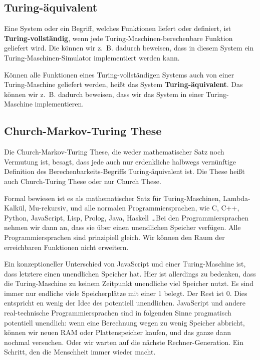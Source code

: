 \documentclass[a4paper]{amsart}
\theoremstyle{definition}
\begin{document}
\subsection{Turing-äquivalent}
Eine System oder ein Begriff, welches Funktionen liefert oder definiert, ist \textbf{Turing-vollständig}, wenn jede Turing-Maschinen-berechenbare Funktion geliefert wird. Die können wir z.~B. dadurch beweisen, dass in diesem System ein Turing-Maschinen-Simulator implementiert werden kann.

Können alle Funktionen eines Turing-vollständigen Systems auch von einer Turing-Maschine geliefert werden, heißt das System \textbf{Turing-äquivalent}. Das können wir z.~B. dadurch beweisen, dass wir das System in einer Turing-Maschine implementieren.

\subsection{Church-Markov-Turing These}
Die Church-Markov-Turing These, die weder mathematischer Satz noch Vermutung ist, besagt, dass jede auch nur erdenkliche halbwegs vernünftige Definition des Berechenbarkeits-Begriffs Turing-äquivalent ist.  Die These heißt auch Church-Turing These oder nur Church These.

Formal bewiesen ist es als mathematischer Satz für 
Turing-Maschinen,
Lambda-Kalkül,
Mu-rekursiv, und alle normalen Programmiersprachen, wie C, C++, Python, JavaScript, Lisp, Prolog, Java, Haskell \dots Bei den Programmiersprachen nehmen wir dann an, dass sie über einen unendlichen Speicher verfügen. Alle Programmiersprachen sind prinzipiell gleich. Wir können den Raum der erreichbaren Funktionen nicht erweitern.

Ein konzeptioneller Unterschied von JavaScript und einer Turing-Maschine ist, dass letztere einen unendlichen Speicher hat. Hier ist allerdings zu bedenken, dass die Turing-Maschine zu keinem Zeitpunkt unendliche viel Speicher nutzt. Es sind immer nur endliche viele Speicherplätze mit einer 1 belegt. Der Rest ist 0. Dies entspricht en wenig der Idee des potentiell unendlichen.
JavaScript und andere real-technische Programmiersprachen sind in folgenden Sinne pragmatisch potentiell unendlich: wenn eine Berechnung wegen zu wenig Speicher abbricht, können wir neuen RAM oder Plattenspeicher kaufen, und das ganze dann nochmal versuchen. Oder wir warten auf die nächste Rechner-Generation. Ein Schritt, den die Menschheit immer wieder macht.
\end{document}
